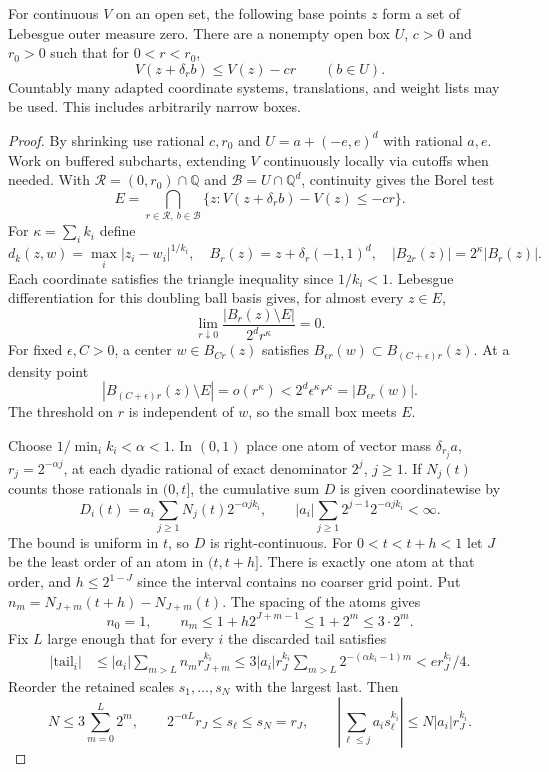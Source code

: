 \begin{lemma}\label{box}
For continuous $V$ on an open set, the following base points $z$
form a set of Lebesgue outer measure zero. There are a nonempty
open box $U$, $c>0$ and $r_0>0$ such that for $0<r<r_0$,
\[
          V(z+\delta_r b)\le V(z)-cr \qquad(b\in U).
\]
Countably many adapted coordinate systems, translations, and
weight lists may be used. This includes arbitrarily narrow boxes.
\end{lemma}
\begin{proof}
By shrinking use rational $c,r_0$ and
$U=a+(-e,e)^d$ with rational $a,e$. Work on buffered subcharts,
extending $V$ continuously locally via cutoffs when needed.
With $\mathcal R=(0,r_0)\cap\mathbb Q$ and $\mathcal B=U\cap\mathbb Q^d$,
continuity gives the Borel test
\[
 E=\bigcap_{r\in\mathcal R,\ b\in\mathcal B}
       \{z: V(z+\delta_r b)-V(z)\le-cr\}.
\]
For $\kappa=\sum_i k_i$ define
\[
 d_k(z,w)=\max_i |z_i-w_i|^{1/k_i},\quad B_r(z)=z+\delta_r(-1,1)^d,\quad
 |B_{2r}(z)|=2^\kappa|B_r(z)|.
\]
Each coordinate satisfies the triangle inequality since $1/k_i<1$.
Lebesgue differentiation for this doubling ball basis gives, for almost every $z\in E$,
\[
 \lim_{r\downarrow0}\frac{|B_r(z)\setminus E|}{2^d r^\kappa}=0 .
\]
For fixed $\epsilon,C>0$, a center $w\in B_{Cr}(z)$ satisfies
$B_{\epsilon r}(w)\subset B_{(C+\epsilon)r}(z)$. At a density point
\begin{equation}\label{density-hit}
 |B_{(C+\epsilon)r}(z)\setminus E|=o(r^\kappa)
       < 2^d\epsilon^\kappa r^\kappa=|B_{\epsilon r}(w)|.
\end{equation}
The threshold on $r$ is independent of $w$, so the small box meets $E$.

Choose $1/\min_i k_i<\alpha<1$. In $(0,1)$ place one atom of
vector mass $\delta_{r_j}a$, $r_j=2^{-\alpha j}$, at each dyadic
rational of exact denominator $2^j$, $j\ge1$. If $N_j(t)$ counts those
rationals in $(0,t]$, the cumulative sum $D$ is given coordinatewise by
\begin{equation}\label{clock-series}
 D_i(t)=a_i\sum_{j\ge1}N_j(t)2^{-\alpha j k_i},\qquad
 |a_i|\sum_{j\ge1}2^{j-1}2^{-\alpha j k_i}<\infty .
\end{equation}
The bound is uniform in $t$, so $D$ is right-continuous. For
$0<t<t+h<1$ let $J$ be the least order of an
atom in $(t,t+h]$. There is exactly one atom at that order, and
$h\le 2^{1-J}$ since the interval contains no coarser grid point.
Put $n_m=N_{J+m}(t+h)-N_{J+m}(t)$. The spacing of the atoms gives
\[
 n_0=1,\qquad n_m\le1+h2^{J+m-1}\le 1+2^m\le 3\cdot 2^m .
\]
Fix $L$ large enough that for every $i$ the discarded tail satisfies
\[
 \begin{aligned}
 |\mathrm{tail}_i|
 &\le |a_i|\sum_{m>L}n_m r_{J+m}^{k_i}
 \le 3|a_i|r_J^{k_i}\sum_{m>L}2^{-(\alpha k_i-1)m}
 <e r_J^{k_i}/4 .
 \end{aligned}
\]
Reorder the retained scales $s_1,\ldots,s_N$ with the largest last. Then
\[
 N\le3\sum_{m=0}^L2^m,\qquad 2^{-\alpha L}r_J\le s_\ell\le s_N=r_J,\qquad
 \left|\sum_{\ell\le j}a_i s_\ell^{k_i}\right|\le N|a_i|r_J^{k_i}.
\]


\end{proof}
